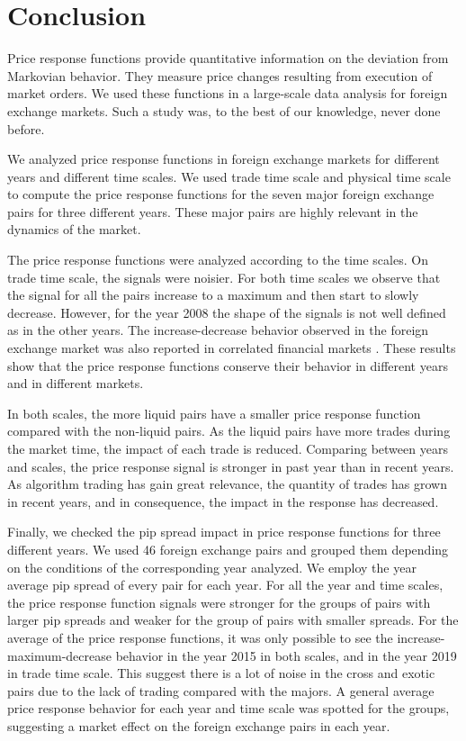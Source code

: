 \section{Conclusion}\label{sec:conclusion}

Price response functions provide quantitative information on the deviation
from Markovian behavior. They measure price changes resulting from execution of
market orders. We used these functions in a large-scale data analysis for
foreign exchange markets. Such a study was, to the best of our knowledge, never
done before.

We analyzed price response functions in foreign exchange markets for different
years and different time scales. We used trade time scale and physical time
scale to compute the price response functions for the seven major foreign
exchange pairs for three different years. These major pairs are highly relevant
in the dynamics of the market.

The price response functions were analyzed according to the time scales. On
trade time scale, the signals were noisier. For both time scales we observe
that the signal for all the pairs increase to a maximum and then start to
slowly decrease. However, for the year 2008 the shape of the signals is not
well defined as in the other years. The increase-decrease behavior observed in
the foreign exchange market was also reported in correlated financial markets
\cite{my_paper_response_financial_arxiv,Wang_2016_avg}. These results show that
the price response functions conserve their behavior in different years and in
different markets.

In both scales, the more liquid pairs have a smaller price response function
compared with the non-liquid pairs. As the liquid pairs have more trades during
the market time, the impact of each trade is reduced. Comparing between years
and scales, the price response signal is stronger in past year than in recent
years. As algorithm trading has gain great relevance, the quantity of trades
has grown in recent years, and in consequence, the impact in the response has
decreased.

Finally, we checked the pip spread impact in price response functions for three
different years. We used 46 foreign exchange pairs and grouped them depending
on the conditions of the corresponding year analyzed. We employ the year
average pip spread of every pair for each year. For all the year and time
scales, the price response function signals were stronger for the groups of
pairs with larger pip spreads and weaker for the group of pairs with smaller
spreads. For the average of the price response functions, it was only possible
to see the increase-maximum-decrease behavior in the year 2015 in both scales,
and in the year 2019 in trade time scale. This suggest there is a lot of noise
in the cross and exotic pairs due to the lack of trading compared with the
majors. A general average price response behavior for each year and time scale
was spotted for the groups, suggesting a market effect on the foreign exchange
pairs in each year.

